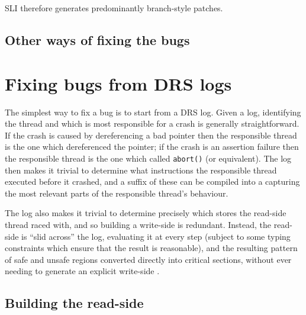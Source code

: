 SLI therefore generates predominantly branch-style patches.


\subsection{Other ways of fixing the bugs}


\section{Fixing bugs from DRS logs}
\label{sect:fix_from_drs}
The simplest way to fix a bug is to start from a DRS log.
Given a log, identifying the thread and which is most responsible for a crash is generally straightforward.
If the crash is caused by dereferencing a bad pointer then the responsible thread is the one which dereferenced the pointer; if the crash is an assertion failure then the responsible thread is the one which called \verb|abort()| (or equivalent).
The log then makes it trivial to determine what instructions the responsible thread executed before it crashed, and a suffix of these can be compiled into a \StateMachine capturing the most relevant parts of the responsible thread's behaviour.

The log also makes it trivial to determine precisely which stores the read-side thread raced with, and so building a write-side \StateMachine is redundant.
Instead, the read-side \StateMachine is ``slid across'' the log, evaluating it at every step (subject to some typing constraints which ensure that the result is reasonable), and the resulting pattern of safe and unsafe regions converted directly into critical sections, without ever needing to generate an explicit write-side \StateMachines.

\subsection{Building the read-side \StateMachine}

